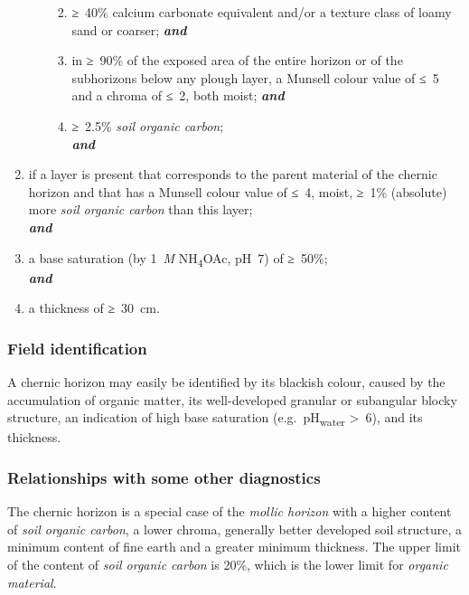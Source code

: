 \documentclass[
  letterpaper,
  DIV=11,
  numbers=noendperiod]{scrreprt}
\providecommand{\tightlist}{%
  \setlength{\itemsep}{0pt}\setlength{\parskip}{0pt}}\usepackage{longtable,booktabs,array}
\begin{document}
\begin{enumerate}
\begin{enumerate}
    \begin{enumerate}
    \def\labelenumiii{\roman{enumiii}.}
    \tightlist
    \item
      ≥~40\% calcium carbonate equivalent and/or a texture class of
      loamy sand or coarser; \textbf{\emph{and}}
    \item
      in ≥~90\% of the exposed area of the entire horizon or of the
      subhorizons below any plough layer, a Munsell colour value of ≤~5
      and a chroma of ≤~2, both moist; \textbf{\emph{and}}
    \item
      ≥~2.5\% \emph{soil organic carbon};\\
      \textbf{\emph{and}}
    \end{enumerate}
  \end{enumerate}
\item
  if a layer is present that corresponds to the parent material of the
  chernic horizon and that has a Munsell colour value of ≤~4, moist,
  ≥~1\% (absolute) more \emph{soil organic carbon} than this layer;\\
  \textbf{\emph{and}}
\item
  a base saturation (by 1~\emph{M} NH\textsubscript{4}OAc, pH~7) of
  ≥~50\%;\\
  \textbf{\emph{and}}
\item
  a thickness of ≥~30~cm.
\end{enumerate}

\hypertarget{field-identification-3}{%
\subsubsection{Field identification}\label{field-identification-3}}

A chernic horizon may easily be identified by its blackish colour,
caused by the accumulation of organic matter, its well-developed
granular or subangular blocky structure, an indication of high base
saturation (e.g.~pH\textsubscript{water} \textgreater~6), and its
thickness.

\hypertarget{relationships-with-some-other-diagnostics-5}{%
\subsubsection{Relationships with some other
diagnostics}\label{relationships-with-some-other-diagnostics-5}}

The chernic horizon is a special case of the \emph{mollic horizon} with
a higher content of \emph{soil organic carbon}, a lower chroma,
generally better developed soil structure, a minimum content of fine
earth and a greater minimum thickness. The upper limit of the content of
\emph{soil organic carbon} is 20\%, which is the lower limit for
\emph{organic material}.
\end{document}
